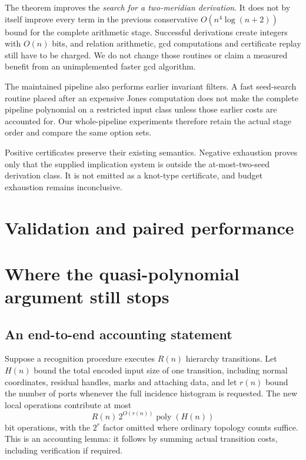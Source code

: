 \documentclass[11pt,a4paper]{article}
\theoremstyle{definition}\newtheorem{definition}[theorem]{Definition}
\theoremstyle{remark}\newtheorem{remark}[theorem]{Remark}
\newcommand{\poly}{\operatorname{poly}}
\begin{document}
The theorem improves the \emph{search for a two-meridian derivation}. It
does not by itself improve every term in the previous conservative
$O(n^4\log(n+2))$ bound for the complete arithmetic stage. Successful
derivations create integers with $O(n)$ bits, and relation arithmetic,
gcd computations and certificate replay still have to be charged.
We do not change those routines or claim a measured benefit from an
unimplemented faster gcd algorithm.

The maintained pipeline also performs earlier invariant filters. A fast
seed-search routine placed after an expensive Jones computation does not
make the complete pipeline polynomial on a restricted input class unless
those earlier costs are accounted for. Our whole-pipeline experiments
therefore retain the actual stage order and compare the same option sets.

Positive certificates preserve their existing semantics. Negative
exhaustion proves only that the supplied implication system is outside
the at-most-two-seed derivation class. It is not emitted as a knot-type
certificate, and budget exhaustion remains inconclusive.

\section{Validation and paired performance}
\label{sec:experiments}


\section{Where the quasi-polynomial argument still stops}
\label{sec:gap}

\subsection{An end-to-end accounting statement}

Suppose a recognition procedure executes $R(n)$ hierarchy transitions. Let
$H(n)$ bound the total encoded input size of one transition, including
normal coordinates, residual handles, marks and attaching data, and let
$r(n)$ bound the number of ports whenever the full incidence histogram is
requested. The new local operations contribute at most
\[
 R(n)\,2^{O(r(n))}\poly(H(n))
\]
bit operations, with the $2^r$ factor omitted where ordinary topology
counts suffice. This is an accounting lemma: it follows by summing actual
transition costs, including verification if required.
\end{document}
